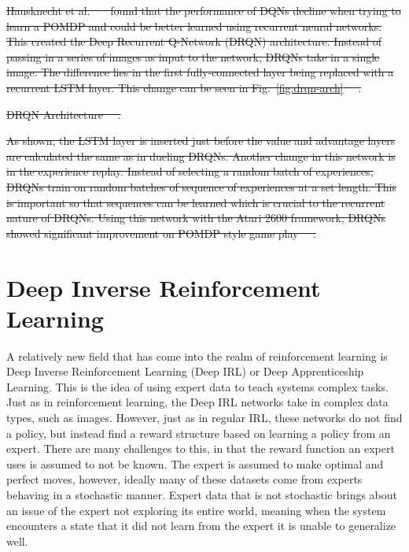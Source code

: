 \documentclass[12pt,american]{report}
\providecommand{\DIFdeltex}[1]{{\protect\color{red}\sout{#1}}}                      %
\providecommand{\DIFdelend}{} %
\providecommand{\DIFdelFL}[1]{\DIFdel{#1}} %
\providecommand{\DIFdel}[1]{\texorpdfstring{\DIFdeltex{#1}}{}} %
\DeclareRobustCommand{\DIFdelend}{\DIFOaddend \let\includegraphics\DIFOincludegraphics} %
\begin{document}
\DIFdel{Hausknecht et al.~\mbox{%
\cite{HausknechtDRQN} }%
found that the performance of DQNs decline when trying to learn a POMDP and could be better learned using recurrent neural networks. This created the Deep Recurrent Q-Network (DRQN) architecture. Instead of passing in a series of images as input to the network, DRQNs take in a single image. The difference lies in the first fully-connected layer being replaced with a recurrent LSTM layer. This change can be seen in Fig.~\ref{fig:drqn-arch}~\mbox{%
\cite{HausknechtDRQN}}%
.
}%

{%
\DIFdelFL{DRQN Architecture~\mbox{%
\cite{HausknechtDRQN}}%
.}}

\DIFdel{As shown, the LSTM layer is inserted just before the value and advantage layers are calculated the same as in dueling DRQNs. Another change in this network is in the experience replay.  Instead of selecting a random batch of experiences, DRQNs train on random batches of sequence of experiences at a set length.  This is important so that sequences can be learned which is crucial to the recurrent nature of DRQNs. Using this network with the Atari 2600 framework, DRQNs showed significant improvement on POMDP style game play~\mbox{%
\cite{HausknechtDRQN}}%
. 
}%

\DIFdelend \section{Deep Inverse Reinforcement Learning}
A relatively new field that has come into the realm of reinforcement learning is Deep Inverse Reinforcement Learning (Deep IRL) or Deep Apprenticeship Learning.  This is the idea of using expert data to teach systems complex tasks.  Just as in reinforcement learning, the Deep IRL networks take in complex data types, such as images.  However, just as in regular IRL, these networks do not find a policy, but instead find a reward structure based on learning a policy from an expert.  There are many challenges to this, in that the reward function an expert uses is assumed to not be known.  The expert is assumed to make optimal and perfect moves, however, ideally many of these datasets come from experts behaving in a stochastic manner.  Expert data that is not stochastic brings about an issue of the expert not exploring its entire world, meaning when the system encounters a state that it did not learn from the expert it is unable to generalize well.  
\end{document}
